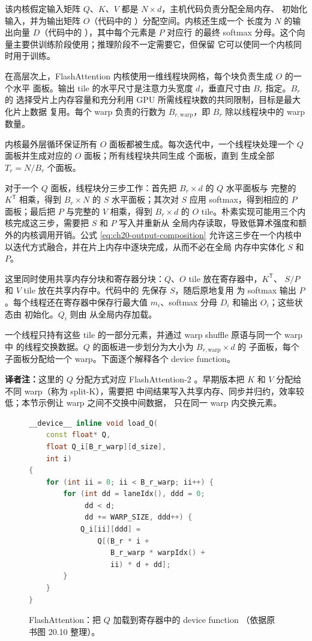 该内核假定输入矩阵 $Q$、$K$、$V$ 都是 $N\times d$，主机代码负责分配全局内存、
初始化输入，并为输出矩阵 $O$（代码中的 ）分配空间。内核还生成一个
长度为 $N$ 的输出向量 $D$（代码中的 ），其中每个元素是 $P$ 对应行
的最终 softmax 分母。这个向量主要供训练阶段使用；推理阶段不一定需要它，但保留
它可以使同一个内核同时用于训练。

在高层次上，FlashAttention 内核使用一维线程块网格，每个块负责生成 $O$ 的一个水平
面板。输出 tile 的水平尺寸是注意力头宽度 $d$，垂直尺寸由 $B_r$ 指定。$B_r$ 的
选择受片上内存容量和充分利用 GPU 所需线程块数的共同限制，目标是最大化片上数据
复用。每个 warp 负责的行数为 $B_{r,\mathrm{warp}}$，即 $B_r$ 除以线程块中的
warp 数量。

内核最外层循环保证所有 $O$ 面板都被生成。每次迭代中，一个线程块处理一个 $Q$
面板并生成对应的 $O$ 面板；所有线程块共同生成  个面板，直到
生成全部 $T_r=N/B_r$ 个面板。

对于一个 $Q$ 面板，线程块分三步工作：首先把 $B_r\times d$ 的 $Q$ 水平面板与
完整的 $K^{\mathsf T}$ 相乘，得到 $B_r\times N$ 的 $S$ 水平面板；其次对 $S$ 应用
softmax，得到相应的 $P$ 面板；最后把 $P$ 与完整的 $V$ 相乘，得到 $B_r\times d$
的 $O$ tile。朴素实现可能用三个内核完成这三步，需要把 $S$ 和 $P$ 写入并重新从
全局内存读取，导致低算术强度和额外的内核调用开销。公式 \eqref{eq:ch20-output-composition}
允许这三步在一个内核中以迭代方式融合，并在片上内存中逐块完成，从而不必在全局
内存中实体化 $S$ 和 $P$。

这里同时使用共享内存分块和寄存器分块：$Q$、$O$ tile 放在寄存器中，$K^{\mathsf T}$、
$S/P$ 和 $V$ tile 放在共享内存中。代码中的  先保存 $S$，随后原地复用
为 softmax 输出 $P$。每个线程还在寄存器中保存行最大值 $m_i$、softmax 分母
$D_i$ 和输出 $O_i$；这些状态由  初始化。$Q_i$ 则由
 从全局内存加载。

一个线程只持有这些 tile 的一部分元素，并通过 warp shuffle 原语与同一个 warp 中
的线程交换数据。$Q$ 的面板进一步划分为大小为 $B_{r,\mathrm{warp}}\times d$ 的
子面板，每个子面板分配给一个 warp。下面逐个解释各个 device function。

\noindent\textbf{译者注：}这里的 $Q$ 分配方式对应 FlashAttention-2
\cite{ch20-8}。早期版本把 $K$ 和 $V$ 分配给不同 warp（称为 split-K），需要把
中间结果写入共享内存、同步并归约，效率较低；本节示例让 warp 之间不交换中间数据，
只在同一 warp 内交换元素。

\begin{figure}[htbp]
  \centering
  \begin{lstlisting}[language=C++,basicstyle=\ttfamily\scriptsize]
__device__ inline void load_Q(
    const float* Q,
    float Q_i[B_r_warp][d_size],
    int i)
{
    for (int ii = 0; ii < B_r_warp; ii++) {
        for (int dd = laneIdx(), ddd = 0;
             dd < d;
             dd += WARP_SIZE, ddd++) {
            Q_i[ii][ddd] =
                Q[(B_r * i +
                   B_r_warp * warpIdx() +
                   ii) * d + dd];
        }
    }
}
  \end{lstlisting}
  \caption{FlashAttention：把 $Q$ 加载到寄存器中的 device function
  （依据原书图 20.10 整理）。}
  \label{fig:20-10}
\end{figure}

